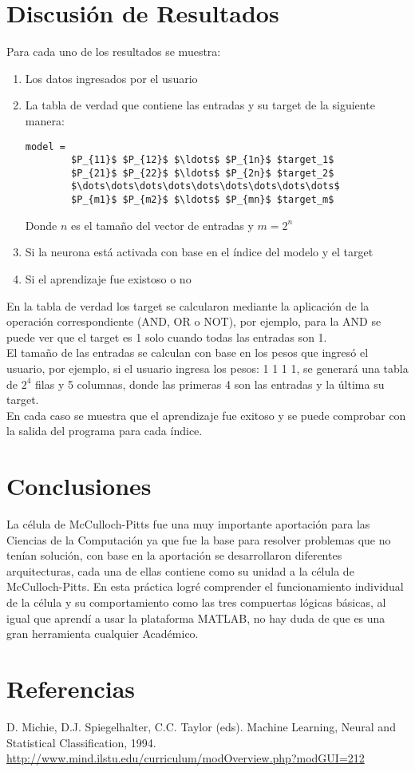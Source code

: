 \documentclass{article}
\begin{document}
\section{Discusión de Resultados}
Para cada uno de los resultados se muestra:
\begin{enumerate}
	\item Los datos ingresados por el usuario
	\item La tabla de verdad que contiene las entradas y su target de la siguiente manera:
	\begin{lstlisting}[mathescape=true]
		model = 
		$P_{11}$ $P_{12}$ $\ldots$ $P_{1n}$ $target_1$
		$P_{21}$ $P_{22}$ $\ldots$ $P_{2n}$ $target_2$
		$\dots\dots\dots\dots\dots\dots\dots\dots\dots$
		$P_{m1}$ $P_{m2}$ $\ldots$ $P_{mn}$ $target_m$
	\end{lstlisting}
	Donde $n$ es el tamaño del vector de entradas y $m = 2^n$
	\item Si la neurona está activada con base en el índice del modelo y el target
	\item Si el aprendizaje fue existoso o no
\end{enumerate}
En la tabla de verdad los target se calcularon mediante la aplicación de la operación correspondiente (AND, OR o NOT), por ejemplo, para la AND se puede ver que el target es 1 solo cuando todas las entradas son 1. \\
El tamaño de las entradas se calculan con base en los pesos que ingresó el usuario, por ejemplo, si el usuario ingresa los pesos: 1 1 1 1, se generará una tabla de $2^4$ filas y 5 columnas, donde las primeras 4 son las entradas y la última su target.\\
En cada caso se muestra que el aprendizaje fue exitoso y se puede comprobar con la salida del programa para cada índice.
\section{Conclusiones}
La célula de McCulloch-Pitts fue una muy importante aportación para las Ciencias de la Computación ya que fue la base para resolver problemas que no tenían solución, con base en la aportación se desarrollaron diferentes arquitecturas, cada una de ellas contiene como su unidad a la célula de McCulloch-Pitts. En esta práctica logré comprender el funcionamiento individual de la célula y su comportamiento como las tres compuertas lógicas básicas, al igual que aprendí a usar la plataforma MATLAB, no hay duda de que es una gran herramienta cualquier Académico.
\section{Referencias}
D. Michie, D.J. Spiegelhalter, C.C. Taylor (eds). Machine Learning, Neural and Statistical Classification, 1994.\\
\url{http://www.mind.ilstu.edu/curriculum/modOverview.php?modGUI=212}
\end{document}
